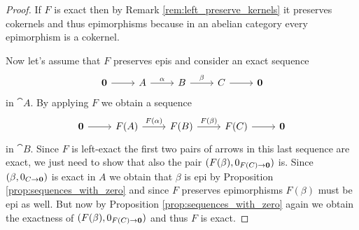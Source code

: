 \begin{proof}
  If \(F\) is exact then by Remark \ref{rem:left_preserve_kernels} it preserves cokernels and thus epimorphisms because in an abelian category every epimorphism is a cokernel.

  Now let's assume that \(F\) preserves epis and consider an exact sequence
  \[\begin{tikzcd}{\bf 0} \ar[r, ""] & A \ar[r, "\alpha"] & B \ar[r, "\beta"] & C \ar[r, ""] & {\bf 0}\end{tikzcd}\]
  in \(\cat{A}\). By applying \(F\) we obtain a sequence 
  \[\begin{tikzcd}{\bf 0} \ar[r, ""] & F(A) \ar[r, "F(\alpha)"] & F(B) \ar[r, "F(\beta)"] & F(C) \ar[r, ""] & {\bf 0}\end{tikzcd}\]
  in \(\cat{B}\). Since \(F\) is left-exact the first two pairs of arrows in this last sequence are exact, we just need to show that also the pair \((F(\beta), 0_{F(C)\to{\bf 0}})\) is. Since \((\beta, 0_{C\to{\bf 0}})\) is exact in \(A\) we obtain that \(\beta\) is epi by Proposition \ref{prop:sequences_with_zero} and since \(F\) preserves epimorphisms \(F(\beta)\) must be epi as well. But now by Proposition \ref{prop:sequences_with_zero} again we obtain the exactness of \((F(\beta), 0_{F(C)\to{\bf 0}})\) and thus \(F\) is exact.
\end{proof}
